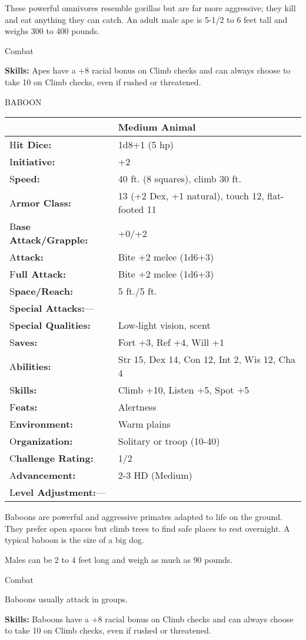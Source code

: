 \documentclass{article}
\begin{document}
These powerful omnivores resemble gorillas but are far more aggressive; they kill 
and eat anything they can catch. An adult male ape is 5-1/2 to 6 feet tall and 
weighs 300 to 400 pounds.

Combat

\textbf{Skills:} Apes have a +8 racial bonus on Climb checks and can always choose 
to take 10 on Climb checks, even if rushed or threatened.

\vspace{12pt}
BABOON

\begin{tabular}{|>{\raggedright}p{91pt}|>{\raggedright}p{193pt}|}
\hline
  & Medium Animal\tabularnewline
\hline
H\textbf{it Dice:} & 1d8+1 (5 hp)\tabularnewline
\hline
I\textbf{nitiative:} & +2\tabularnewline
\hline
S\textbf{peed:} & 40 ft. (8 squares), climb 30 ft.\tabularnewline
\hline
A\textbf{rmor Class:} & 13 (+2 Dex, +1 natural), touch 12, flat-footed 11\tabularnewline
\hline
B\textbf{ase Attack/Grapple:} & +0/+2\tabularnewline
\hline
A\textbf{ttack:} & Bite +2 melee (1d6+3)\tabularnewline
\hline
F\textbf{ull Attack:} & Bite +2 melee (1d6+3)\tabularnewline
\hline
S\textbf{pace/Reach:} & 5 ft./5 ft.\tabularnewline
\hline
S\textbf{pecial Attacks:}--- & \tabularnewline
\hline
S\textbf{pecial Qualities:} & Low-light vision, scent\tabularnewline
\hline
S\textbf{aves:} & Fort +3, Ref +4, Will +1\tabularnewline
\hline
A\textbf{bilities:} & Str 15, Dex 14, Con 12, Int 2, Wis 12, Cha 4\tabularnewline
\hline
S\textbf{kills:} & Climb +10, Listen +5, Spot +5\tabularnewline
\hline
F\textbf{eats:} & Alertness\tabularnewline
\hline
E\textbf{nvironment:} & Warm plains\tabularnewline
\hline
O\textbf{rganization:} & Solitary or troop (10-40)\tabularnewline
\hline
C\textbf{hallenge Rating:} & 1/2\tabularnewline
\hline
A\textbf{dvancement:} & 2-3 HD (Medium)\tabularnewline
\hline
L\textbf{evel Adjustment:}--- & \tabularnewline
\hline
\end{tabular}

Baboons are powerful and aggressive primates adapted to life on the ground. They 
prefer open spaces but climb trees to find safe places to rest overnight. A typical 
baboon is the size of a big dog.

Males can be 2 to 4 feet long and weigh as much as 90 pounds.

Combat

Baboons usually attack in groups.

\textbf{Skills: }Baboons have a +8 racial bonus on Climb checks and can always 
choose to take 10 on Climb checks, even if rushed or threatened.
\end{document}
